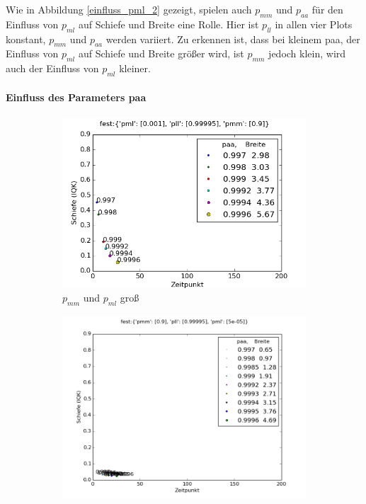 Wie in Abbildung \ref{einfluss_pml_2} gezeigt, spielen auch $p_{mm}$ und $p_{aa}$ für den Einfluss von $p_{ml}$ auf Schiefe und Breite eine Rolle. Hier ist $p_{ll}$ in allen vier Plots konstant, $p_{mm}$ und $p_{aa}$ werden variiert. Zu erkennen ist, dass bei kleinem paa, der Einfluss von $p_{ml}$ auf Schiefe und Breite größer wird, ist $p_{mm}$ jedoch klein, wird auch der Einfluss von $p_{ml}$ kleiner.


\paragraph*{Einfluss des Parameters paa}

\begin{figure}[H]
\begin{subfigure}[t]{0.5\textwidth}
\includegraphics[width=\textwidth]{bilder/paa/3fest_09_0001_p_099995}
\caption{$p_{mm}$ und $p_{ml}$ groß}
\end{subfigure}
\begin{subfigure}[t]{0.5\textwidth}
\includegraphics[width=\textwidth]{bilder/paa/3fest_09_5e-05_p_099995}

\end{subfigure}
\end{figure}
